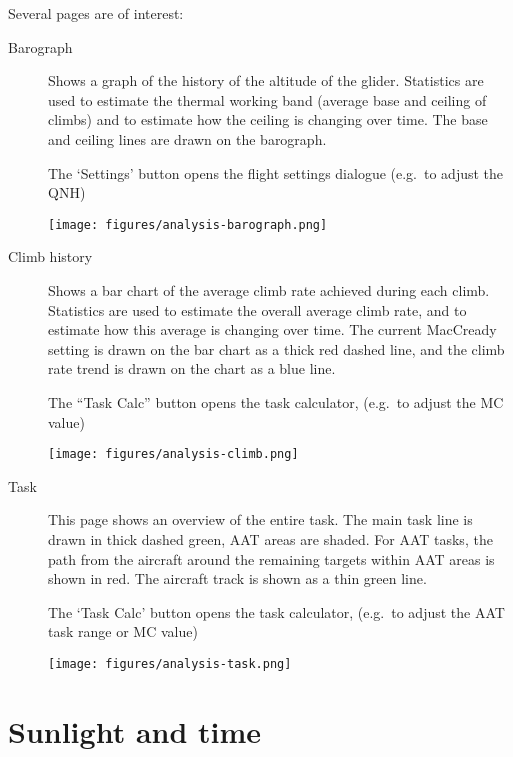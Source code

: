 Several pages are of interest:
\begin{description}
\item[Barograph]  Shows a graph of the history of the altitude of the glider.
  Statistics are used to estimate the thermal working band (average
  base and ceiling of climbs) and to estimate how the ceiling is
  changing over time.  The base and ceiling lines are drawn on the
  barograph.

  The `Settings' button opens the flight settings dialogue
  (e.g.\ to adjust the QNH)

\begin{center}
\texttt{[image: figures/analysis-barograph.png]}
\end{center}

\item[Climb history]
  Shows a bar chart of the average climb rate achieved during each
  climb.  Statistics are used to estimate the overall average climb
  rate, and to estimate how this average is changing over time.  The
  current MacCready setting is drawn on the bar chart as a thick red
  dashed line, and the climb rate trend is drawn on the chart as a
  blue line.

  The ``Task Calc'' button opens the task calculator,
  (e.g.\ to adjust the MC value)

\begin{center}
\texttt{[image: figures/analysis-climb.png]}
\end{center}

\item[Task]
  This page shows an overview of the entire task.  The main task line
  is drawn in thick dashed green, AAT areas are shaded.  For AAT
  tasks, the path from the aircraft around the remaining targets within AAT
  areas is shown in red.  The aircraft track is shown as a thin green line.

  The `Task Calc' button opens the task calculator,
  (e.g.\ to adjust the AAT task range or MC value)

\begin{center}
\texttt{[image: figures/analysis-task.png]}
\end{center}

\end{description}

\section{Sunlight and time}

